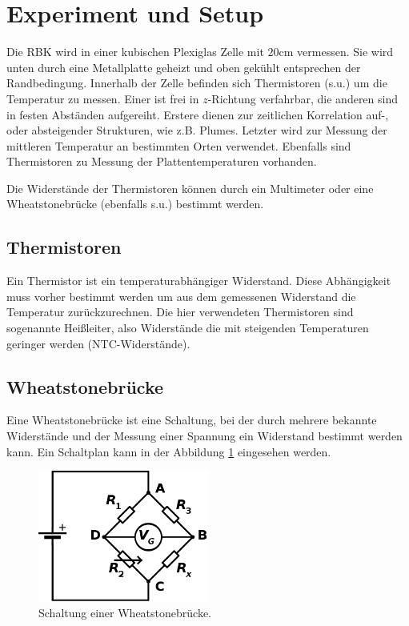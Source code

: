 \documentclass[12pt,a4paper,titlepage,headinclude]{scrartcl}
\numberwithin{equation}{subsection}
\begin{document}
\newpage
\section{Experiment und Setup}
\label{sec:durchfuehrung}

Die RBK wird in einer kubischen Plexiglas Zelle mit $20\si{\centi\meter}$ vermessen.
Sie wird unten durch eine Metallplatte geheizt und oben gekühlt entsprechen der Randbedingung.
Innerhalb der Zelle befinden sich Thermistoren (s.u.) um die Temperatur zu messen.
Einer ist frei in $z$-Richtung verfahrbar, die anderen sind in festen Abständen aufgereiht.
Erstere dienen zur zeitlichen Korrelation auf-, oder absteigender Strukturen, wie z.B. Plumes.
Letzter wird zur Messung der mittleren Temperatur an bestimmten Orten verwendet.
Ebenfalls sind Thermistoren zu Messung der Plattentemperaturen vorhanden.

Die Widerstände der Thermistoren können durch ein Multimeter oder eine Wheatstonebrücke (ebenfalls s.u.) bestimmt werden.

\subsection{Thermistoren}
Ein Thermistor ist ein temperaturabhängiger Widerstand.
Diese Abhängigkeit muss vorher bestimmt werden um aus dem gemessenen Widerstand die Temperatur zurückzurechnen.
Die hier verwendeten Thermistoren sind sogenannte Heißleiter, also Widerstände die mit steigenden Temperaturen geringer werden (NTC-Widerstände).

\subsection{Wheatstonebrücke}
Eine Wheatstonebrücke ist eine Schaltung, bei der durch mehrere bekannte Widerstände und der Messung einer Spannung ein Widerstand bestimmt werden kann.
Ein Schaltplan kann in der Abbildung \ref{fig:wheat} eingesehen werden.
\begin{figure}[!ht]
\centering
\includegraphics[width=0.5\textwidth]{Wheatstone.png}
\caption{Schaltung einer Wheatstonebrücke.\protect\footnotemark}
\label{fig:wheat}
\end{figure}
\end{document}

